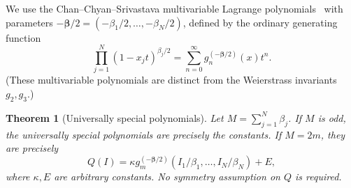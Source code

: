 \documentclass[11pt]{article}
\newtheorem{theorem}{Theorem}[section]
\begin{document}
We use the Chan--Chyan--Srivastava multivariable Lagrange
polynomials~\cite{ccs,ccs-umbral} with parameters
$-\boldsymbol\beta/2=(-\beta_1/2,\ldots,-\beta_N/2)$, defined by
the ordinary generating function
\begin{equation}\label{eq:special-ccs}
 \prod_{j=1}^{N}(1-x_jt)^{\beta_j/2}
 =\sum_{n=0}^{\infty}g_n^{(-\boldsymbol\beta/2)}(x)t^n.
\end{equation}
(These multivariable polynomials are distinct from the Weierstrass
invariants $g_2,g_3$.)

\begin{theorem}[Universally special polynomials]\label{thm:special-Q}
Let $M=\sum_{j=1}^{N}\beta_j$. If $M$ is odd, the universally special
polynomials are precisely the constants. If $M=2m$, they are precisely
\begin{equation}\label{eq:special-Q}
 Q(I)=\kappa g_m^{(-\boldsymbol\beta/2)}
                  (I_1/\beta_1,\ldots,I_N/\beta_N)+E,
\end{equation}
where $\kappa,E$ are arbitrary constants.
No symmetry assumption on $Q$ is required.
\end{theorem}
\end{document}
